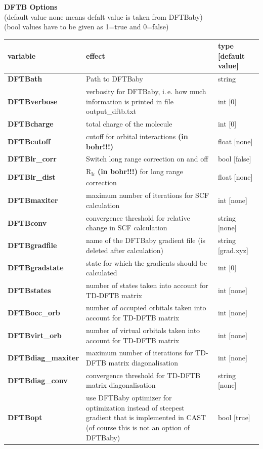 \documentclass[10pt,a4paper]{article} %
\begin{document}
\textbf{DFTB Options} 
\\(default value none means defalt value is taken from DFTBaby)
\\(bool values have to be given as 1=true and 0=false)

\begin{longtable}{|p{3.5cm}|p{5cm}|p{3cm}|}
	variable & effect & type [default value] \\
	\hline
	\textbf{DFTBath} & Path to DFTBaby & string \\
	\textbf{DFTBverbose} & verbosity for DFTBaby, i.\,e. how much information is printed in file output\_dftb.txt & int [0] \\	
	\textbf{DFTBcharge} & total charge of the molecule & int [0] \\
	\textbf{DFTBcutoff} & cutoff for orbital interactions \textbf{(in bohr!!!)} & float [none] \\
	\textbf{DFTBlr\_corr} & Switch long range correction on and off & bool [false] \\
	\textbf{DFTBlr\_dist} & R\textsubscript{lr} \textbf{(in bohr!!!)} for long range correction & float [none] \\
	\textbf{DFTBmaxiter} & maximum number of iterations for SCF calculation & int [none] \\
	\textbf{DFTBconv} & convergence threshold for relative change in SCF calculation & string [none] \\
	\textbf{DFTBgradfile} & name of the DFTBaby gradient file (is deleted after calculation) & string [grad.xyz] \\
	\textbf{DFTBgradstate} & state for which the gradients should be calculated & int [0] \\
	\textbf{DFTBstates} & number of states taken into account for TD-DFTB matrix & int [none] \\
	\textbf{DFTBocc\_orb} & number of occupied orbitals taken into account for TD-DFTB matrix & int [none] \\
	\textbf{DFTBvirt\_orb} & number of virtual orbitals taken into account for TD-DFTB matrix & int [none] \\
	\textbf{DFTBdiag\_maxiter} & maximum number of iterations for TD-DFTB matrix diagonalisation & int [none] \\
	\textbf{DFTBdiag\_conv} & convergence threshold for TD-DFTB matrix diagonalisation & string [none] \\
	\textbf{DFTBopt} & use DFTBaby optimizer for optimization instead of steepest gradient that is implemented in CAST (of course this is not an option of DFTBaby) & bool [true] \\
\end{longtable} 
\end{document}

